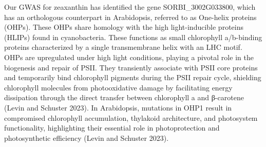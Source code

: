 \documentclass[10pt,letterpaper]{article}
\begin{document}
Our GWAS for zeaxanthin has identified the gene SORBI\_3002G033800, which has an orthologous counterpart in Arabidopsis, referred to as One-helix proteins (OHPs). These OHPs share homology with the high light-inducible proteins (HLIPs) found in cyanobacteria. These functions as small chlorophyll a/b-binding proteins characterized by a single transmembrane helix with an LHC motif. OHPs are upregulated under high light conditions, playing a pivotal role in the biogenesis and repair of PSII. They transiently associate with PSII core proteins and temporarily bind chlorophyll pigments during the PSII repair cycle, shielding chlorophyll molecules from photooxidative damage by facilitating energy dissipation through the direct transfer between chlorophyll a and β-carotene (Levin and Schuster 2023). In Arabidopsis, mutations in OHP1 result in compromised chlorophyll accumulation, thylakoid architecture, and photosystem functionality, highlighting their essential role in photoprotection and photosynthetic efficiency (Levin and Schuster 2023).


\end{document}
